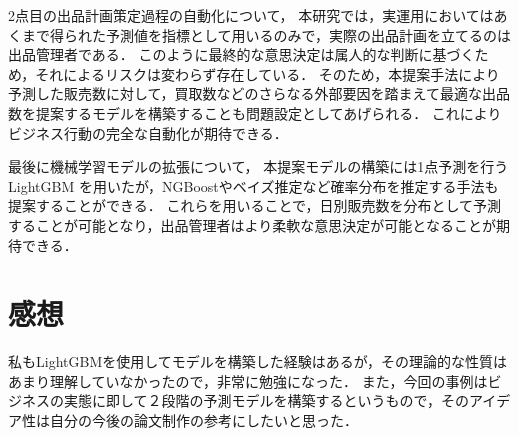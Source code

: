 \documentclass[dvipdfmx]{jreport}
\begin{document}
2点目の出品計画策定過程の自動化について，
本研究では，実運用においてはあくまで得られた予測値を指標として用いるのみで，実際の出品計画を立てるのは出品管理者である．
このように最終的な意思決定は属人的な判断に基づくため，それによるリスクは変わらず存在している．
そのため，本提案手法により予測した販売数に対して，買取数などのさらなる外部要因を踏まえて最適な出品数を提案するモデルを構築することも問題設定としてあげられる．
これによりビジネス行動の完全な自動化が期待できる．

最後に機械学習モデルの拡張について，
本提案モデルの構築には1点予測を行うLightGBM を用いたが，NGBoostやベイズ推定など確率分布を推定する手法も提案することができる．
これらを用いることで，日別販売数を分布として予測することが可能となり，出品管理者はより柔軟な意思決定が可能となることが期待できる．

\section{感想}
私もLightGBMを使用してモデルを構築した経験はあるが，その理論的な性質はあまり理解していなかったので，非常に勉強になった．
また，今回の事例はビジネスの実態に即して２段階の予測モデルを構築するというもので，そのアイデア性は自分の今後の論文制作の参考にしたいと思った．
\end{document}
